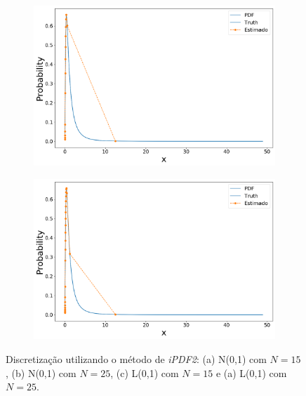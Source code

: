 \begin{figure}[H]
	\begin{subfigure}[b]{0.45\textwidth}
		\centering 
		\includegraphics[width=\linewidth]{./figuras/iPDF2_lognormal_15}
		\caption{}
		\label{fig:ipdf2lognorm15}
	\end{subfigure}
	\hfill
	\begin{subfigure}[b]{0.45\textwidth}
		\centering 
		\includegraphics[width=\linewidth]{./figuras/iPDF2_lognormal_25}
		\caption{}
		\label{fig:ipdf2lognorm25}
	\end{subfigure}
	
	\caption{Discretização utilizando o método de \textit{iPDF2}: (a) N(0,1) com $N = 15$, (b) N(0,1) com $N = 25$, (c) L(0,1) com $N = 15$ e (a) L(0,1) com $N = 25$.}
	\label{fig:ipdf2norm}
\end{figure}


%

